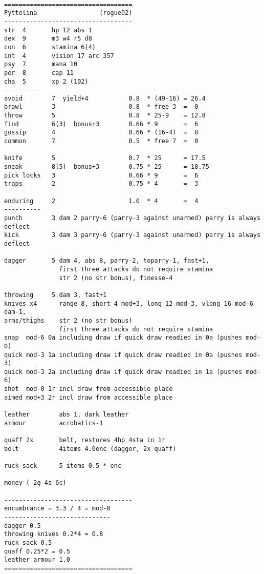 \

\pagebreak[1]
\tiny \begin{samepage} \begin{verbatim}
===================================
Pyttelina                 (rogue02)
-----------------------------------
str  4       hp 12 abs 1
dex  9       m3 w4 r5 d8
con  6       stamina 6(4)
int  4       vision 17 arc 357
psy  7       mana 10
per  8       cap 11
cha  5       xp 2 (102)
----------
avoid        7  yield+4           0.8  * (49-16) = 26.4
brawl        3                    0.8  * free 3  =  0
throw        5                    0.8  * 25-9    = 12.8
find         6(3)  bonus+3        0.66 * 9       =  6
gossip       4                    0.66 * (16-4)  =  8
common       7                    0.5  * free 7  =  0

knife        5                    0.7  * 25      = 17.5
sneak        8(5)  bonus+3        0.75 * 25      = 18.75
pick locks   3                    0.66 * 9       =  6
traps        2                    0.75 * 4       =  3

enduring     2                    1.0  * 4       =  4
----------
punch        3 dam 2 parry-6 (parry-3 against unarmed) parry is always deflect
kick         3 dam 3 parry-6 (parry-3 against unarmed) parry is always deflect

dagger       5 dam 4, abs 8, parry-2, toparry-1, fast+1,
               first three attacks do not require stamina
               str 2 (no str bonus), finesse-4

throwing     5 dam 3, fast+1
knives x4      range 8, short 4 mod+3, long 12 mod-3, vlong 16 mod-6 dam-1,
arms/thighs    str 2 (no str bonus)
               first three attacks do not require stamina
snap  mod-6 0a including draw if quick draw readied in 0a (pushes mod-0)
quick mod-3 1a including draw if quick draw readied in 0a (pushes mod-3)
quick mod-3 2a including draw if quick draw readied in 1a (pushes mod-6)
shot  mod-0 1r incl draw from accessible place
aimed mod+3 2r incl draw from accessible place

leather        abs 1, dark leather
armour         acrobatics-1

quaff 2x       belt, restores 4hp 4sta in 1r
belt           4items 4.0enc (dagger, 2x quaff)

ruck sack      5 items 0.5 * enc

money ( 2g 4s 6c)

-----------------------------------
encumbrance = 3.3 / 4 = mod-0
-----------------------------
dagger 0.5
throwing knives 0.2*4 = 0.8
ruck sack 0.5
quaff 0.25*2 = 0.5
leather armour 1.0
===================================
\end{verbatim} \end{samepage} \normalsize



